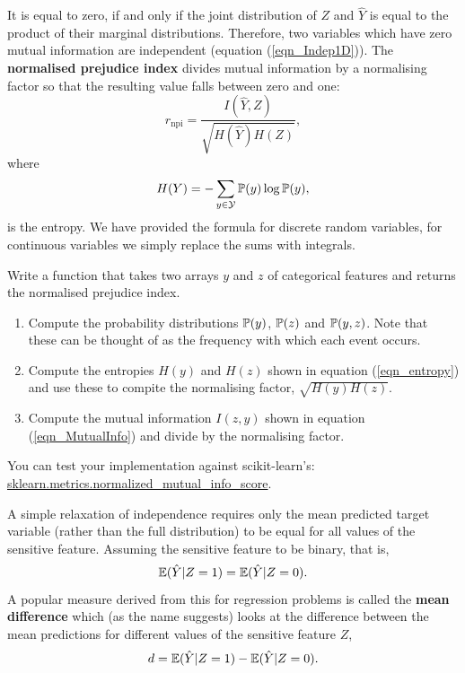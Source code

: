 It is equal to zero, if and only if the joint distribution of $Z$ and $\hat{Y}$ is equal to the product of their marginal distributions. Therefore, two variables which have zero mutual information are independent (equation (\ref{eqn_Indep1D})). The \textbf{normalised prejudice index}\cite{Fukuchi} divides mutual information by a normalising factor so that the resulting value falls between zero and one:
\begin{equation} \label{eqn_npi}
r_{\text{npi}} = \frac{I(\hat{Y},Z)}{\sqrt{H(\hat{Y})H(Z)}},
\end{equation}
where
\begin{equation} \label{eqn_entropy}
H(Y) = -\sum_{y \in \mathcal{Y}} \mathbb{P}(y) \log \mathbb{P}(y),
\end{equation}
is the entropy. We have provided the formula for discrete random variables, for continuous variables we simply replace the sums with integrals.

\begin{lookbox}
Write a function that takes two arrays $y$ and $z$ of categorical features and returns the normalised prejudice index.
\begin{enumerate}
\item Compute the probability distributions $\mathbb{P}(y)$, $\mathbb{P}(z)$ and $\mathbb{P}(y,z)$. Note that these can be thought of as the frequency with which each event occurs.
\item Compute the entropies $H(y)$ and $H(z)$ shown in equation (\ref{eqn_entropy}) and use these to compite the normalising factor, $\sqrt{H(y)H(z)}$.
\item Compute the mutual information $I(z,y)$ shown in equation (\ref{eqn_MutualInfo}) and divide by the normalising factor.
\end{enumerate}
You can test your implementation against scikit-learn's:\\ \href{https://scikit-learn.org/stable/modules/generated/sklearn.metrics.normalized\_mutual\_info\_score.html}{sklearn.metrics.normalized\_mutual\_info\_score}.
\end{lookbox}


A simple relaxation of independence requires only the mean predicted target variable (rather than the full distribution) to be equal for all values of the sensitive feature. Assuming the sensitive feature to be binary, that is,
\[
\mathbb{E}(\hat{Y} | Z=1) = \mathbb{E}(\hat{Y} | Z=0).
\]
A popular measure derived from this for regression problems is called the \textbf{mean difference} which (as the name suggests) looks at the difference between the mean predictions for different values of the sensitive feature $Z$,
\[
d = \mathbb{E}(\hat{Y} | Z=1) - \mathbb{E}(\hat{Y} | Z=0).
\]

